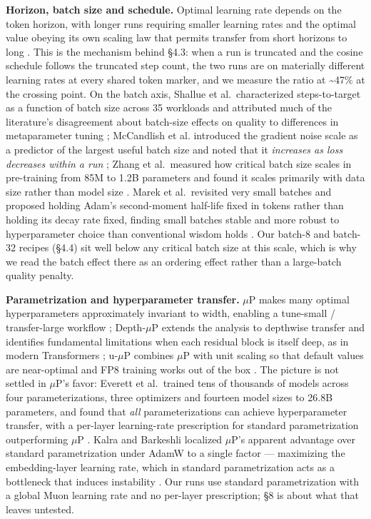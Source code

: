 \textbf{Horizon, batch size and schedule.} Optimal learning rate depends on the token horizon, with
longer runs requiring smaller learning rates and the optimal value obeying its own scaling law
that permits transfer from short horizons to long \cite{ref31}. This is the mechanism behind \S4.3: when a
run is truncated and the cosine schedule follows the truncated step count, the two runs are on
materially different learning rates at every shared token marker, and we measure the ratio at
\textasciitilde47\% at the crossing point. On the batch axis, Shallue et al.~characterized steps-to-target as a
function of batch size across 35 workloads and attributed much of the literature's disagreement
about batch-size effects on quality to differences in metaparameter tuning \cite{ref27}; McCandlish et al.
introduced the gradient noise scale as a predictor of the largest useful batch size and noted that
it \emph{increases as loss decreases within a run} \cite{ref28}; Zhang et al.~measured how critical batch size
scales in pre-training from 85M to 1.2B parameters and found it scales primarily with data size
rather than model size \cite{ref29}. Marek et al.~revisited very small batches and proposed holding Adam's
second-moment half-life fixed in tokens rather than holding its decay rate fixed, finding small
batches stable and more robust to hyperparameter choice than conventional wisdom holds \cite{ref30}. Our
batch-8 and batch-32 recipes (\S4.4) sit well below any critical batch size at this scale, which is
why we read the batch effect there as an ordering effect rather than a large-batch quality
penalty.

\textbf{Parametrization and hyperparameter transfer.} $\mu$P makes many optimal hyperparameters
approximately invariant to width, enabling a tune-small / transfer-large workflow \cite{ref12}; Depth-$\mu$P
extends the analysis to depthwise transfer and identifies fundamental limitations when each
residual block is itself deep, as in modern Transformers \cite{ref33}; u-$\mu$P combines $\mu$P with unit scaling
so that default values are near-optimal and FP8 training works out of the box \cite{ref34}. The picture is
not settled in $\mu$P's favor: Everett et al.~trained tens of thousands of models across four
parameterizations, three optimizers and fourteen model sizes to 26.8B parameters, and found that
\emph{all} parameterizations can achieve hyperparameter transfer, with a per-layer learning-rate
prescription for standard parametrization outperforming $\mu$P \cite{ref32}. Kalra and Barkeshli localized
$\mu$P's apparent advantage over standard parametrization under AdamW to a single factor --- maximizing
the embedding-layer learning rate, which in standard parametrization acts as a bottleneck that
induces instability \cite{ref35}. Our runs use standard parametrization with a global Muon learning rate
and no per-layer prescription; \S8 is about what that leaves untested.

